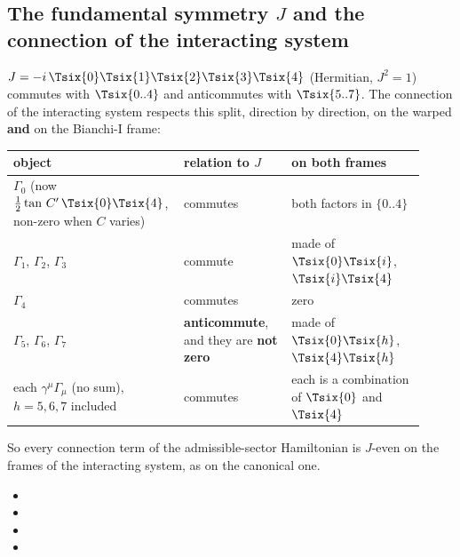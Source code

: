 \subsection{The fundamental symmetry \texorpdfstring{$J$}{J} and the connection of the interacting system}
\label{sec:6.20}

$J=-i\,\Tsix{0}\Tsix{1}\Tsix{2}\Tsix{3}\Tsix{4}$ (Hermitian, $J^2=1$) commutes with $\Tsix{0..4}$ and
anticommutes with $\Tsix{5..7}$. The connection of the interacting system respects this split, direction
by direction, on the warped \textbf{and} on the Bianchi-I frame:
\begin{center}
\small
\renewcommand{\arraystretch}{1.3}
\begin{tabular}{@{}>{\raggedright\arraybackslash}p{0.36\linewidth}>{\raggedright\arraybackslash}p{0.25\linewidth}>{\raggedright\arraybackslash}p{0.31\linewidth}@{}}
\toprule
object & relation to $J$ & on both frames\\
\midrule
$\Gamma_0$ (now $\tfrac12\tan\,C'\,\Tsix{0}\Tsix{4}$, non-zero when $C$ varies) & commutes & both factors in $\{0..4\}$\\
$\Gamma_1$, $\Gamma_2$, $\Gamma_3$ & commute & made of $\Tsix{0}\Tsix{i}$, $\Tsix{i}\Tsix{4}$\\
$\Gamma_4$ & commutes & zero\\
$\Gamma_5$, $\Gamma_6$, $\Gamma_7$ & \textbf{anticommute}, and they are \textbf{not zero} & made of $\Tsix{0}\Tsix{h}$, $\Tsix{4}\Tsix{h}$\\
each $\gamma^\mu\Gamma_\mu$ (no sum), $h=5,6,7$ included & commutes & each is a combination of $\Tsix{0}$ and $\Tsix{4}$\\
\bottomrule
\end{tabular}
\end{center}
So every connection term of the admissible-sector Hamiltonian is $J$-even on the frames of the
interacting system, as on the canonical one. 
\begin{itemize}
  \item {}
  \item {}
  \item {}
  \item {}
\end{itemize}


